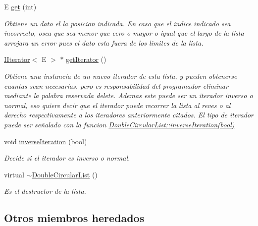 \begin{DoxyCompactItemize}
E \hyperlink{classDoubleCircularList_aa00bc8fd524af1ba208f85d8816dec52}{get} (int)
\begin{DoxyCompactList}\small\item\em Obtiene un dato el la posicion indicada. En caso que el indice indicado sea incorrecto, osea que sea menor que cero o mayor o igual que el largo de la lista arrojara un error pues el dato esta fuera de los limites de la lista. \end{DoxyCompactList}\item 
\hyperlink{classIIterator}{I\-Iterator}$<$ E $>$ $\ast$ \hyperlink{classDoubleCircularList_abba1430e956c7660a88f786bfd8d87ad}{get\-Iterator} ()
\begin{DoxyCompactList}\small\item\em Obtiene una instancia de un nuevo iterador de esta lista, y pueden obtenerse cuantas sean necesarias. pero es responsabilidad del programador eliminar mediante la palabra reservada delete. Ademas este puede ser un iterador inverso o normal, eso quiere decir que el iterador puede recorrer la lista al reves o al derecho respectivamente a los iteradores anteriormente citados. El tipo de iterador puede ser señalado con la funcion \hyperlink{classDoubleCircularList_a77212c5d6ad148c99a06009a8c44128b}{Double\-Circular\-List\-::inverse\-Iteration(bool)}\end{DoxyCompactList}\item 
void \hyperlink{classDoubleCircularList_a77212c5d6ad148c99a06009a8c44128b}{inverse\-Iteration} (bool)
\begin{DoxyCompactList}\small\item\em Decide si el iterador es inverso o normal. \end{DoxyCompactList}\item 
\hypertarget{classDoubleCircularList_a26dba8b85983742cfbf38886245fe2a4}{virtual \hyperlink{classDoubleCircularList_a26dba8b85983742cfbf38886245fe2a4}{$\sim$\-Double\-Circular\-List} ()}\label{classDoubleCircularList_a26dba8b85983742cfbf38886245fe2a4}

\begin{DoxyCompactList}\small\item\em Es el destructor de la lista. \end{DoxyCompactList}\end{DoxyCompactItemize}
\subsection*{Otros miembros heredados}


